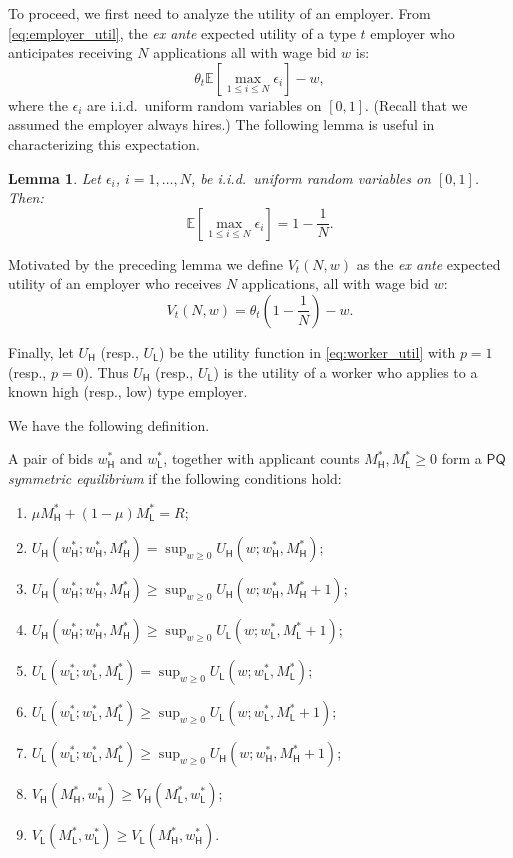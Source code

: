 \documentclass[11pt]{article}
\renewcommand{\H}{\ensuremath{\mathsf{H}}}
\renewcommand{\L}{\ensuremath{\mathsf{L}}}
\newcommand{\HT}{\ensuremath{\mathsf{PQ}}}
\newcommand{\E}{\ensuremath{\mathbb{E}}}
\newtheorem{lemma}{Lemma}
\begin{document}
To proceed, we first need to analyze the utility of an employer.
From \eqref{eq:employer_util}, the {\em ex ante} expected utility of a type $t$ employer who anticipates receiving $N$ applications all with wage bid $w$ is:
\[ \theta_t \E[\max_{1 \leq i \leq N} \epsilon_i] - w,\]
where the $\epsilon_i$ are i.i.d.~uniform random variables on $[0,1]$.
(Recall that we assumed the employer always hires.)
The following lemma is useful in characterizing this expectation.

\begin{lemma}
Let $\epsilon_i$, $i = 1, \ldots, N$, be i.i.d.~uniform random variables on $[0,1]$.  Then:
\[ \E[\max_{1 \leq i \leq N} \epsilon_i] = 1 - \frac{1}{N}. \]
\end{lemma}

Motivated by the preceding lemma we define $V_t(N, w)$ as the {\em ex ante} expected utility of an employer who receives $N$ applications, all with wage bid $w$:
\begin{equation}
\label{eq:employer_util2}
V_t(N,w) = \theta_t \left( 1- \frac{1}{N}\right) - w.
\end{equation}

Finally, let $U_{\H}$ (resp., $U_{\L}$) be the utility function in \eqref{eq:worker_util} with $p = 1$ (resp., $p = 0$).
Thus $U_{\H}$ (resp., $U_{\L}$) is the utility of a worker who applies to a known high (resp., low) type employer.  

We have the following definition.

\begin{definition}
\label{def:ht}
A pair of bids $w_\H^*$ and $w_\L^*$, together with applicant counts $M_\H^*, M_\L^* \geq 0$ form a {\em $\HT$ symmetric equilibrium} if the following conditions hold:
\begin{enumerate}
\item $\mu M_\H^* + (1-\mu) M_\L^* = R$;
\item $U_{\H}(w_\H^* ; w_\H^*, M_\H^*) = \sup_{w\geq 0} U_{\H}(w ; w_\H^*, M_\H^*)$;
\item $U_{\H}(w_\H^* ; w_\H^*, M_\H^*) \geq \sup_{w\geq 0} U_{\H}(w ; w_\H^*, M_\H^*+1)$;
\item $U_{\H}(w_\H^* ; w_\H^*, M_\H^*) \geq \sup_{w\geq 0} U_{\L}(w ; w_\L^*, M_\L^*+1)$;
\item $U_{\L}(w_\L^* ; w_\L^*, M_\L^*) = \sup_{w\geq 0} U_{\L}(w ; w_\L^*, M_\L^*)$;
\item $U_{\L}(w_\L^* ; w_\L^*, M_\L^*) \geq \sup_{w\geq 0} U_{\L}(w ; w_\L^*, M_\L^*+1)$;
\item $U_{\L}(w_\L^* ; w_\L^*, M_\L^*) \geq \sup_{w\geq 0} U_{\H}(w ; w_\H^*, M_\H^*+1)$;
\item $V_\H(M_\H^*, w_\H^*) \geq V_\H(M_\L^*, w_\L^*)$;
\item $V_\L(M_\L^*, w_\L^*) \geq V_\L(M_\H^*, w_\H^*)$.
\end{enumerate}
\end{definition}
\end{document}

